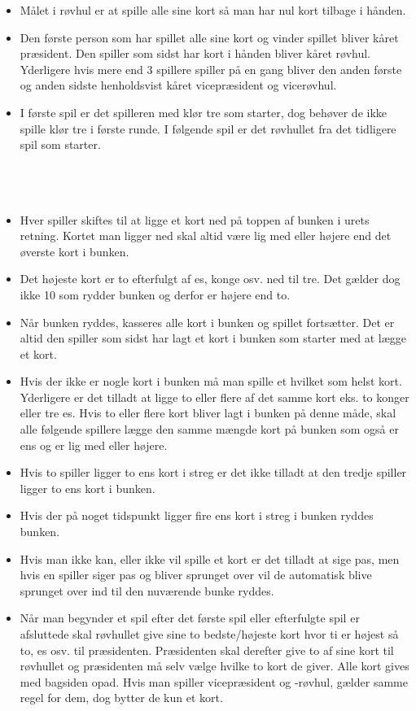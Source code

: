 \documentclass[a4paper, 12pt]{article}
\begin{document}
\begin{multicols}{2}
\begin{itemize}
    \item Målet i røvhul er at spille alle sine kort så man har nul kort tilbage i hånden.
    \item Den første person som har spillet alle sine kort og vinder spillet bliver kåret præsident. Den spiller som sidst har kort i hånden bliver kåret røvhul. Yderligere hvis mere end 3 spillere spiller på en gang bliver den anden første og anden sidste henholdsvist kåret vicepræsident og vicerøvhul.
    \item I første spil er det spilleren med klør tre som starter, dog behøver de ikke spille klør tre i første runde. I følgende spil er det røvhullet fra det tidligere spil som starter.
    \\ \\ \\ \\
    \item Hver spiller skiftes til at ligge et kort ned på toppen af bunken i urets retning. Kortet man ligger ned skal altid være lig med eller højere end det øverste kort i bunken. 
    \item Det højeste kort er to efterfulgt af es, konge osv. ned til tre. Det gælder dog ikke 10 som rydder bunken og derfor er højere end to.
    \item Når bunken ryddes, kasseres alle kort i bunken og spillet fortsætter. Det er altid den spiller som sidst har lagt et kort i bunken som starter med at lægge et kort.
    \item Hvis der ikke er nogle kort i bunken må man spille et hvilket som helst kort. Yderligere er det tilladt at ligge to eller flere af det samme kort eks. to konger eller tre es. Hvis to eller flere kort bliver lagt i bunken på denne måde, skal alle følgende spillere lægge den samme mængde kort på bunken som også er ens og er lig med eller højere.
    \item Hvis to spiller ligger to ens kort i streg er det ikke tilladt at den tredje spiller ligger to ens kort i bunken.
    \item Hvis der på noget tidspunkt ligger fire ens kort i streg i bunken ryddes bunken.
    \pagebreak
    \item Hvis man ikke kan, eller ikke vil spille et kort er det tilladt at sige pas, men hvis en spiller siger pas og bliver sprunget over vil de automatisk blive sprunget over ind til den nuværende bunke ryddes.
    \item Når man begynder et spil efter det første spil eller efterfulgte spil er afsluttede skal røvhullet give sine to bedste/højeste kort hvor ti er højest så to, es osv. til præsidenten. Præsidenten skal derefter give to af sine kort til røvhullet og præsidenten må selv vælge hvilke to kort de giver. Alle kort gives med bagsiden opad. Hvis man spiller vicepræsident og -røvhul, gælder samme regel for dem, dog bytter de kun et kort. 
\end{itemize}
\bigbreak


\end{multicols}
\end{document}
